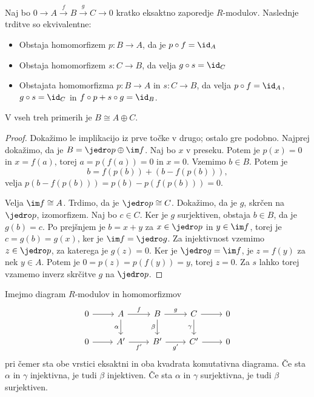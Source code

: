 \begin{trditev}
  Naj bo $0 \to A \xrightarrow{f} B \xrightarrow{g} C \to 0$ kratko eksaktno
  zaporedje $R$-modulov.
  Naslednje trditve so ekvivalentne:
  \begin{itemize}
  \item Obstaja homomorfizem $p: B \to A$, da je $p \circ f = \id_A$
  \item Obstaja homomorfizem $s: C \to B$, da velja $g \circ s = \id_C$
  \item Obstajata homomorfizma $p: B \to A$ in $s: C \to B$, da velja $p \circ f
	= \id_A$, $g \circ s = \id_C$ in $f\circ p + s \circ g = \id_B$.
  \end{itemize}
  V vseh treh primerih je $B \cong A \oplus C$.
\end{trditev}

\begin{proof}
  Dokažimo le implikacijo iz prve točke v drugo; ostalo gre podobno.
  Najprej dokažimo, da je $B = \jedro p \oplus \im f$.
  Naj bo $x$ v preseku.
  Potem je $p(x) = 0$ in $x = f(a)$, torej $a = p(f(a)) = 0$ in $x = 0$.
  Vzemimo $b \in B$.
  Potem je
  \[
	b = f(p(b)) + (b - f(p(b))),
  \]
  velja $p(b - f(p(b))) = p(b) - p(f(p(b))) = 0$.

  Velja $\im f \cong A$.
  Trdimo, da je $\jedro p \cong C$.
  Dokažimo, da je $g$, skrčen na $\jedro p$, izomorfizem.
  Naj bo $c \in C$.
  Ker je $g$ surjektiven, obstaja $b \in B$, da je $g(b) = c$.
  Po prejšnjem je $b = x + y$ za $x \in \jedro p$ in $y \in \im f$, torej je $c
  = g(b) = g(x)$, ker je $\im f = \jedro g$.
  Za injektivnost vzemimo $z \in \jedro p$, za katerega je $g(z) = 0$.
  Ker je $\jedro g = \im f$, je $z = f(y)$ za nek $y \in A$.
  Potem je $0 = p(z) = p(f(y)) = y$, torej $z = 0$.
  Za $s$ lahko torej vzamemo inverz skrčitve $g$ na $\jedro p$.
\end{proof}


\begin{izrek}
  Imejmo diagram $R$-modulov in homomorfizmov
  \[\begin{tikzcd}
	  0 & A & B & C & 0 \\
	  0 & A' & B' & C' & 0
	  \arrow[from=1-1, to=1-2]
	  \arrow["f", from=1-2, to=1-3]
	  \arrow["\alpha"', from=1-2, to=2-2]
	  \arrow["g", from=1-3, to=1-4]
	  \arrow["\beta"', from=1-3, to=2-3]
	  \arrow[from=1-4, to=1-5]
	  \arrow["\gamma"', from=1-4, to=2-4]
	  \arrow[from=2-1, to=2-2]
	  \arrow["{f'}"', from=2-2, to=2-3]
	  \arrow["{g'}"', from=2-3, to=2-4]
	  \arrow[from=2-4, to=2-5]
	\end{tikzcd}\]
  pri čemer sta obe vrstici eksaktni in oba kvadrata komutativna diagrama.
  Če sta $\alpha$ in $\gamma$ injektivna, je tudi $\beta$ injektiven.
  Če sta $\alpha$ in $\gamma$ surjektivna, je tudi $\beta$ surjektiven.
\end{izrek}

